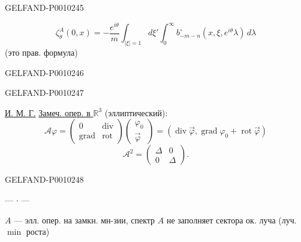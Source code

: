 \begin{GelfandAdjacentEvidence}{GELFAND-P001024}{5}

\begin{equation*}
\zeta_\theta^A(0,x)=-\frac{e^{i\theta}}{m}\int_{|\xi|=1}d\xi'
\int_0^\infty b^\circ_{-m-n}(x,\xi,e^{i\theta}\lambda)\,d\lambda
\tag{16}
\end{equation*}
(это прав. формула)
\end{GelfandAdjacentEvidence}
\begin{GelfandAdjacentEvidence}{GELFAND-P001024}{6}

\end{GelfandAdjacentEvidence}
\begin{GelfandAdjacentEvidence}{GELFAND-P001024}{7}


\underline{И. М. Г.} \underline{Замеч. опер. в $\mathbb R^3$} (эллиптический):
\begin{equation*}
\mathcal A\varphi=
\begin{pmatrix}0&\operatorname{div}\\\operatorname{grad}&\operatorname{rot}\end{pmatrix}
\begin{pmatrix}\varphi_0\\\vec\varphi\end{pmatrix}
=(\operatorname{div}\vec\varphi,\operatorname{grad}\varphi_0+\operatorname{rot}\vec\varphi)
\tag{17}
\end{equation*}
\[
\mathcal A^2=\begin{pmatrix}\Delta&0\\0&\Delta\end{pmatrix}.
\]
\end{GelfandAdjacentEvidence}
\begin{GelfandAdjacentEvidence}{GELFAND-P001024}{8}


\begin{center}--- $\cdot$ ---\end{center}

$A$ --- элл. опер. на замкн. мн-зии, спектр $A$ не заполняет сектора ок. луча (луч. $\min$ роста)
\end{GelfandAdjacentEvidence}
